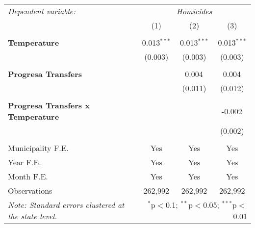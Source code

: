 \begin{tabular}{@{}l*{3}{c}@{}}
\hline
\hline
\multicolumn{1}{l}{\textit{Dependent variable:}} &\multicolumn{3}{c}{\textit{Homicides}} \\

\cmidrule(lr){1-1}  \cmidrule(lr){2-4}

&\multicolumn{1}{c}{(1)}&\multicolumn{1}{c}{(2)}&\multicolumn{1}{c}{(3)}\\

\\

\textbf{Temperature} & 0.013$^{***}$ & 0.013$^{***}$ & 0.013$^{***}$ \\
& (0.003) & (0.003) & (0.003) \\
\\
\textbf{Progresa Transfers} & & 0.004$^{}$ & 0.004$^{}$ \\
& & (0.011) & (0.012) \\
\\
\textbf{Progresa Transfers x Temperature}& & & -0.002$^{}$ \\
& & & (0.002) \\
\\
\hline
Municipality F.E. & Yes & Yes & Yes \\
Year F.E. & Yes & Yes & Yes \\
Month F.E. & Yes & Yes & Yes \\
Observations & 262,992 & 262,992 & 262,992 \\
\hline
\hline
\textit{Note: Standard errors clustered at the state level.} & \multicolumn{3}{r}{$^{*}$p$<$0.1; $^{**}$p$<$0.05; $^{***}$p$<$0.01} \\
\end{tabular}
